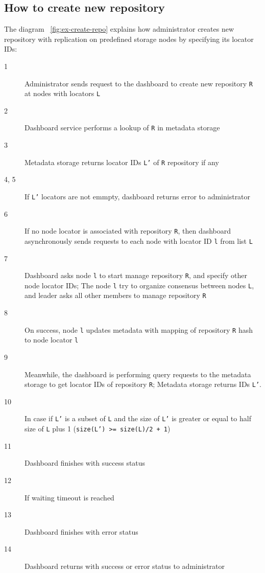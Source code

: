 \documentclass[nonacm=true]{acmart}
\newcommand{\code}[1]{\texttt{#1}}
\begin{document}
\subsection{How to create new repository}

The diagram ~\ref{fig:ex-create-repo} explains how administrator creates new repository with replication
on predefined storage nodes by specifying its locator IDs:
\begin{description}
  \item[1] Administrator sends request to the dashboard to create new repository \code{R} at nodes with locators
    \code{L}
  \item[2] Dashboard service performs a lookup of \code{R} in metadata storage
  \item[3] Metadata storage returns locator IDs \code{L'} of \code{R} repository if any
  \item[4, 5] If \code{L'} locators are not emmpty, dashboard returns error to administrator
  \item[6] If no node locator is associated with repository \code{R}, then dashboard asynchronously sends
    requests to each node with locator ID \code{l} from list \code{L}
  \item[7] Dashboard asks node \code{l} to start manage repository \code{R}, and specify other node locator IDs;
    The node \code{l} try to organize consensus between nodes \code{L}, and leader asks all other members
    to manage repository \code{R}
  \item[8] On success, node \code{l} updates metadata with mapping of repository \code{R} hash to
    node locator \code{l}
  \item[9] Meanwhile, the dashboard is performing query requests to the metadata storage to get locator IDs of
    repository \code{R}; Metadata storage returns IDs \code{L'}.
  \item[10] In case if \code{L'} is a subset of \code{L} and the size of \code{L'} is greater or equal to
    half size of \code{L} plus 1 (\code{size(L') >= size(L)/2 + 1})
  \item[11] Dashboard finishes with success status
  \item[12] If waiting timeout is reached
  \item[13] Dashboard finishes with error status
  \item[14] Dashboard returns with success or error status to administrator

\end{description}
\end{document}
